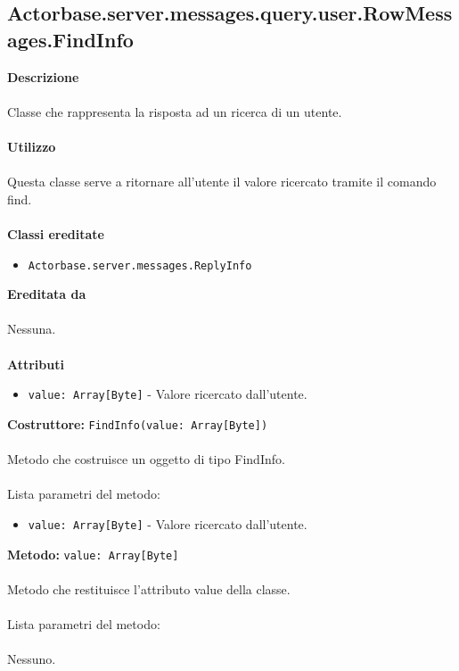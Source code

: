 \documentclass[a4paper]{article}
\begin{document}
	\subsection{Actorbase.server.messages.query.user.RowMessages.FindInfo}
		\textbf{Descrizione}
			\\ \\
		Classe che rappresenta la risposta ad un ricerca di un utente.
			\\ \\
		\textbf{Utilizzo}
			\\ \\
		Questa classe serve a ritornare all'utente il valore ricercato tramite il comando find.
			\\ \\
		\textbf{Classi ereditate}
			\begin{itemize}
				\item \texttt{Actorbase.server.messages.ReplyInfo }
			\end{itemize}
		\textbf{Ereditata da}
			\\ \\
			Nessuna.
			\\ \\
		\textbf{Attributi}
			\begin{itemize}
				\item \texttt{value: Array[Byte]} - Valore ricercato dall'utente.
			\end{itemize}
		\textbf{Costruttore: }\texttt{FindInfo(value: Array[Byte])}
			\\ \\
		Metodo che costruisce un oggetto di tipo FindInfo.
			\\ \\
		Lista parametri del metodo:
			\begin{itemize}
				\item \texttt{value: Array[Byte]} - Valore ricercato dall'utente.
			\end{itemize}
		\textbf{Metodo: }\texttt{value: Array[Byte]}
			\\ \\
		Metodo che restituisce l'attributo value della classe.
			\\ \\
		Lista parametri del metodo:
			\\ \\
			Nessuno.
			
\end{document}
